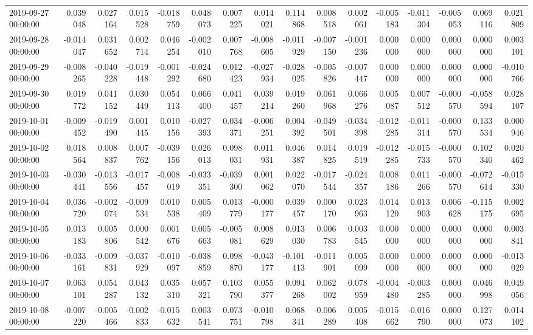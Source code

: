 \begin{tabular}{lrrrrrrrrrrrrrrr}
2019-09-27 00:00:00 & 0.039048 & 0.027164 & 0.015528 & -0.018759 & 0.048073 & 0.007225 & 0.014021 & 0.114868 & 0.008518 & 0.002061 & -0.005183 & -0.011304 & -0.005053 & 0.069116 & 0.021809 \\
2019-09-28 00:00:00 & -0.014047 & 0.031652 & 0.002714 & 0.046254 & -0.002010 & 0.007768 & -0.008605 & -0.011929 & -0.007150 & -0.001236 & 0.000000 & 0.000000 & 0.000000 & 0.000000 & 0.003101 \\
2019-09-29 00:00:00 & -0.008265 & -0.040228 & -0.019448 & -0.001292 & -0.024680 & 0.012423 & -0.027934 & -0.028025 & -0.005826 & -0.007447 & 0.000000 & 0.000000 & 0.000000 & 0.000000 & -0.010766 \\
2019-09-30 00:00:00 & 0.019772 & 0.041152 & 0.030449 & 0.054113 & 0.066400 & 0.041457 & 0.039214 & 0.019260 & 0.061968 & 0.066276 & 0.005087 & 0.007512 & -0.000570 & -0.058594 & 0.028107 \\
2019-10-01 00:00:00 & -0.009452 & -0.019490 & 0.001445 & 0.010156 & -0.027393 & 0.034371 & -0.006251 & 0.004392 & -0.049501 & -0.034398 & -0.012285 & -0.011314 & -0.000570 & 0.133534 & 0.000946 \\
2019-10-02 00:00:00 & 0.018564 & 0.008837 & 0.007762 & -0.039156 & 0.026013 & 0.098031 & 0.011931 & 0.046387 & 0.014825 & 0.019519 & -0.012285 & -0.015733 & -0.000570 & 0.102340 & 0.020462 \\
2019-10-03 00:00:00 & -0.030441 & -0.013556 & -0.017457 & -0.008019 & -0.033351 & -0.039300 & 0.001062 & 0.022070 & -0.017544 & -0.024357 & 0.008186 & 0.011266 & -0.000570 & -0.072614 & -0.015330 \\
2019-10-04 00:00:00 & 0.036720 & -0.002074 & -0.009534 & 0.010538 & 0.005409 & 0.013779 & -0.000177 & 0.039457 & 0.000170 & 0.023963 & 0.014120 & 0.013903 & 0.006628 & -0.115175 & 0.002695 \\
2019-10-05 00:00:00 & 0.013183 & 0.005806 & 0.000542 & 0.001676 & 0.005663 & -0.005081 & 0.008629 & 0.013030 & 0.006783 & 0.003545 & 0.000000 & 0.000000 & 0.000000 & 0.000000 & 0.003841 \\
2019-10-06 00:00:00 & -0.033161 & -0.009831 & -0.037929 & -0.010097 & -0.038859 & 0.098870 & -0.043177 & -0.101413 & -0.011901 & 0.005099 & 0.000000 & 0.000000 & 0.000000 & 0.000000 & -0.013029 \\
2019-10-07 00:00:00 & 0.063101 & 0.054287 & 0.043132 & 0.035310 & 0.057321 & 0.103790 & 0.055377 & 0.094268 & 0.062002 & 0.078959 & -0.004480 & -0.003285 & 0.000000 & 0.046998 & 0.049056 \\
2019-10-08 00:00:00 & -0.007220 & -0.005466 & -0.002833 & -0.015632 & 0.003541 & 0.073751 & -0.010798 & 0.068341 & -0.006289 & 0.005408 & -0.015662 & -0.016790 & 0.000000 & 0.127073 & 0.014102 \\

\end{tabular}
